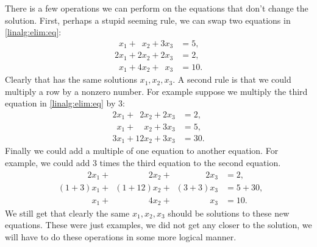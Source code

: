 There is a few operations we can perform on the equations that don't change
the solution.  First, perhaps a stupid seeming rule, we can swap 
two equations in \eqref{linalg:elim:eq}:
\begin{equation*}
\begin{aligned}
\phantom{9} x_1 + \phantom{9} x_2 +           3 x_3 & = 5 , \\
          2 x_1 +           2 x_2 +           2 x_3 & = 2 , \\
\phantom{9} x_1 +           4 x_2 + \phantom{9} x_3 & = 10 .
\end{aligned}
\end{equation*}
Clearly that has the same solutions $x_1,x_2,x_3$.
A second rule is that we could multiply a row by a nonzero number.  For
example suppose we multiply the third equation in \eqref{linalg:elim:eq}
by 3:
\begin{equation*}
\begin{aligned}
          2 x_1 + \phantom{9}  2 x_2 + 2 x_3 & = 2 , \\
\phantom{9} x_1 + \phantom{99}   x_2 + 3 x_3 & = 5 , \\
          3 x_1 +             12 x_2 + 3 x_3 & = 30 .
\end{aligned}
\end{equation*}
Finally we could add a multiple of one equation to another equation.
For example, we could add 3 times the third equation to the second equation.
\begin{equation*}
\begin{aligned}
\phantom{(1+3)} 2 x_1 + \phantom{(1+12)}  2 x_2 + \phantom{(3+3)} 2 x_3 & = 2 , \\
\phantom{2} (1+3) x_1 + \phantom{2}(1+12)   x_2 + \phantom{2} (3+3) x_3 & = 5+30 , \\
\phantom{2 (1+3)} x_1 + \phantom{(1+12)}  4 x_2 + \phantom{(3+3) 2} x_3 & = 10 .
\end{aligned}
\end{equation*}
We still get that clearly the same $x_1,x_2,x_3$ should be solutions
to these new equations.
These were just examples, we did not get any closer to the solution, we will
have to do these operations in some more logical manner.

